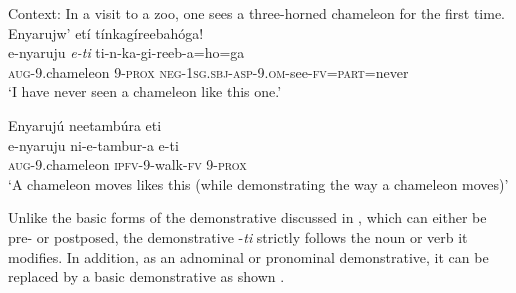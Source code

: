 \documentclass[output=paper 		  ]{langscibook}
\begin{document}
\ea%
    \label{ex:asiimwe:26}
    \ea\label{ex:asiimwe:26a}  Context: In a visit to a zoo, one sees a three-horned chameleon for the first time. \\
    Enyarujw’ etí tínkagíreebahóga!\\
    \gll e-nyaruju  \emph{e-ti}  ti-n-ka-gi-reeb-a=ho=ga\\
\textsc{aug-}9.chameleon  9-\textsc{prox}  \textsc{neg-1sg.sbj-asp-9.om-}see-\textsc{fv=part=}never\\
\glt ‘I have never seen a chameleon like this one.’

  \ex\label{ex:asiimwe:26b} Enyarujú neetambúra eti\\
\gll e-nyaruju  ni-e-tambur-a  e-ti\\
\textsc{aug}{}-9.chameleon  \textsc{ipfv-}9-walk-\textsc{fv}  9-\textsc{prox}\\
    \glt ‘A chameleon moves likes this (while demonstrating the way a chameleon moves)’
    \z
\z

Unlike the basic forms of the demonstrative discussed in , which can either be pre- or postposed, the demonstrative -\textit{ti} strictly follows the noun  or verb  it modifies. In addition, as an adnominal or pronominal demonstrative, it can be replaced by a basic demonstrative as shown .

\ea%
    \label{ex:asiimwe:27}
    \label{ex:asiimwe:27a}

  \label{ex:asiimwe:27b}

  \label{ex:asiimwe:27c}
    \z
\z
\end{document}
